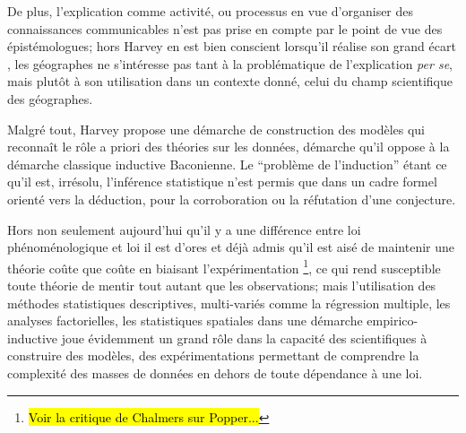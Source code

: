 De plus, l'explication comme activité, ou processus en vue d'organiser des connaissances communicables n'est pas prise en compte par le point de vue des épistémologues; hors Harvey en est bien conscient lorsqu'il réalise son grand écart \autocite[10]{Harvey1969}, les géographes ne s’intéresse pas tant à la problématique de l'explication \textit{per se}, mais plutôt à son utilisation dans un contexte donné, celui du champ scientifique des géographes.

Malgré tout, Harvey propose une démarche de construction des modèles qui reconnaît le rôle a priori des théories sur les données, démarche qu'il oppose à la démarche classique inductive Baconienne. Le \enquote{problème de l'induction} étant ce qu'il est, irrésolu, l'inférence statistique n'est permis que dans un cadre formel orienté vers la déduction, pour la corroboration ou la réfutation d'une conjecture.

Hors non seulement aujourd'hui qu'il y a une différence entre loi phénoménologique et loi il est d'ores et déjà admis qu'il est aisé de maintenir une théorie coûte que coûte en biaisant l'expérimentation \footnote{\hl{Voir la critique de Chalmers sur Popper...} }, ce qui rend susceptible toute théorie de mentir tout autant que les observations; mais l'utilisation des méthodes statistiques descriptives, multi-variés comme la régression multiple, les analyses factorielles, les statistiques spatiales dans une démarche empirico-inductive joue évidemment un grand rôle dans la capacité des scientifiques à construire des modèles, des expérimentations permettant de comprendre la complexité des masses de données en dehors de toute dépendance à une loi. %


